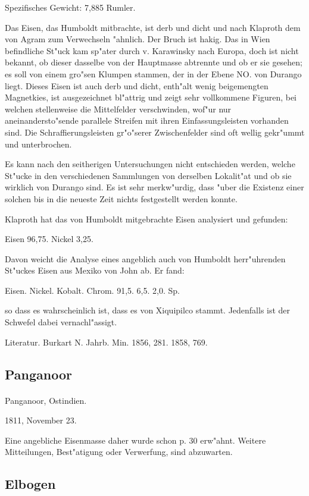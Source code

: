 \documentclass[a4paper, 11pt, oneside]{article}
\begin{document}
Spezifisches Gewicht: 7,885 Rumler.

Das Eisen, das Humboldt mitbrachte, ist derb und dicht und nach Klaproth dem von Agram zum Verwechseln "ahnlich. Der Bruch ist hakig. Das in Wien befindliche St"uck kam sp"ater durch v. Karawinsky nach Europa, doch ist nicht bekannt, ob dieser dasselbe von der Hauptmasse abtrennte und ob er sie gesehen; es soll von einem gro"sen Klumpen stammen, der in der Ebene NO. von Durango liegt. Dieses Eisen ist auch derb und dicht, enth"alt wenig beigemengten Magnetkies, ist ausgezeichnet bl"attrig und zeigt sehr vollkommene Figuren, bei welchen stellenweise die Mittelfelder verschwinden, wof"ur nur aneinandersto"sende parallele Streifen mit ihren Einfassungsleisten vorhanden sind. Die Schraffierungsleisten gr"o"serer Zwischenfelder sind oft wellig gekr"ummt und unterbrochen.

Es kann nach den seitherigen Untersuchungen nicht entschieden werden, welche St"ucke in den verschiedenen Sammlungen von derselben Lokalit"at und ob sie wirklich von Durango sind. Es ist sehr merkw"urdig, dass "uber die Existenz einer solchen bis in die neueste Zeit nichts festgestellt werden konnte.

Klaproth hat das von Humboldt mitgebrachte Eisen analysiert und gefunden:

Eisen 96,75.  
Nickel 3,25.

Davon weicht die Analyse eines angeblich auch von Humboldt herr"uhrenden St"uckes Eisen aus Mexiko von John ab. Er fand:

Eisen. Nickel. Kobalt. Chrom.  
91,5. 6,5. 2,0. Sp.

so dass es wahrscheinlich ist, dass es von Xiquipilco stammt. Jedenfalls ist der Schwefel dabei vernachl"assigt.

Literatur. Burkart N. Jahrb. Min. 1856, 281. 1858, 769.

\subsection{Panganoor}
\normalsize
\paragraph{}
Panganoor, Ostindien.

1811, November 23.

Eine angebliche Eisenmasse daher wurde schon p. 30 erw"ahnt.
Weitere Mitteilungen, Best"atigung oder Verwerfung, sind abzuwarten.

\subsection{Elbogen}
\normalsize
\end{document}
